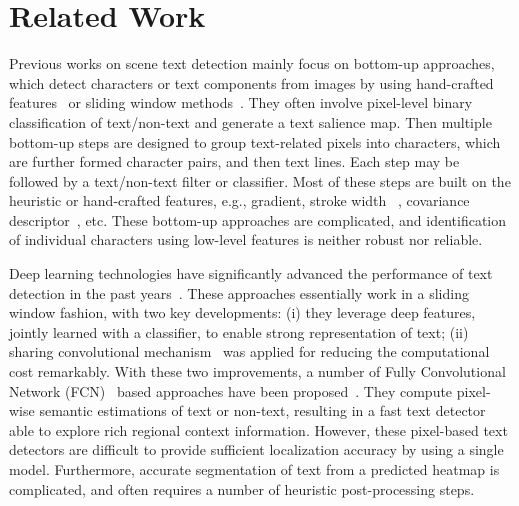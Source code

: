 \documentclass[10pt,twocolumn,letterpaper]{article}
\begin{document}
\section{Related Work}
Previous works on scene text detection mainly focus on bottom-up approaches, which detect characters or text components from images by using hand-crafted features~\cite{Tian2015, Yin2014, Huang2014, Yao2012} or sliding window methods~\cite{Jaderberg2014, Wang2012}. They often involve pixel-level binary classification of text/non-text and generate a text salience map.  Then multiple bottom-up steps are designed to group text-related pixels into characters, which are further formed character pairs, and then text lines. Each step may be followed by a text/non-text filter or classifier. Most of these steps are built on the heuristic or hand-crafted features, e.g., gradient, stroke width ~\cite{Epshtein2010, Huang2013}, covariance descriptor~\cite{Huang2013}, etc. These bottom-up approaches are complicated, and identification of individual characters using low-level features is neither robust nor reliable.

Deep learning technologies have significantly advanced the performance of text detection in the past years~\cite{Tian2016, Gupta2016, Zhang2016, Liao2017, He2016b}. These approaches essentially work in a sliding window fashion, with two key developments: (i) they leverage deep features, jointly learned with a classifier, to enable strong representation of text; (ii) sharing convolutional mechanism~\cite{Long2015,Pan2016_reading} was applied for reducing the computational cost remarkably. With these two improvements, a number of Fully Convolutional Network (FCN)~\cite{Long2015}  based approaches have been proposed~\cite{Zhang2016, He2016b, Yao2016}. They compute pixel-wise semantic estimations of text or non-text, resulting in a fast text detector able to explore rich regional context information. However, these pixel-based text detectors are difficult to provide sufficient localization accuracy by using a single model. Furthermore, accurate segmentation of text from a predicted heatmap is complicated, and often requires a number of heuristic post-processing steps.
\end{document}
